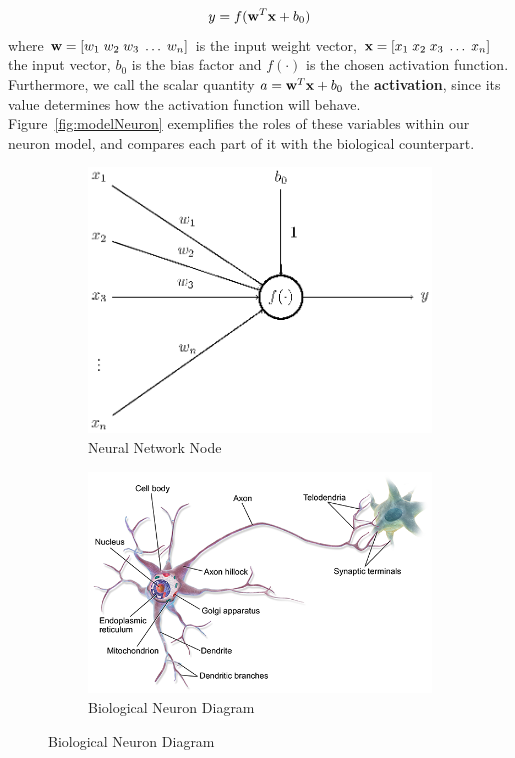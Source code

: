 \begin{equation}
	y = f(\mathbf{w}^T \mathbf{x} + b_0)
\end{equation}
where $\mathbf{w} = \left[ w_1 \; w_2 \;  w_3 \;  \dots \; w_n \right]$ is the input weight vector, $\mathbf{x} = \left[ x_1 \; x_2 \; x_3 \; \dots \; x_n \right]$ the input vector, $b_0$ is the bias factor and $f(\cdot)$ is the chosen activation function. Furthermore, we call the scalar quantity $a = \mathbf{w}^T \mathbf{x} + b_0$ the \textbf{activation}, since its value determines how the activation function will behave. Figure~\ref{fig:modelNeuron} exemplifies the roles of these variables within our neuron model, and compares each part of it with the biological counterpart.

\begin{figure}[!H]
	\begin{subfigure}{0.5\linewidth}
		\centering
		\includegraphics[width=0.9\linewidth]{figures/neuron.eps}
		\caption{Neural Network Node}
		\label{fig:modelNeuron_a}
	\end{subfigure}
	\begin{subfigure}{0.5\linewidth}
		\centering
		\includegraphics[width=0.9\linewidth]{figures/multipolarNeuron.png}
		\caption{Biological Neuron Diagram}
		\label{fig:modelNeuron_b}
	\end{subfigure}
		

\end{figure}
